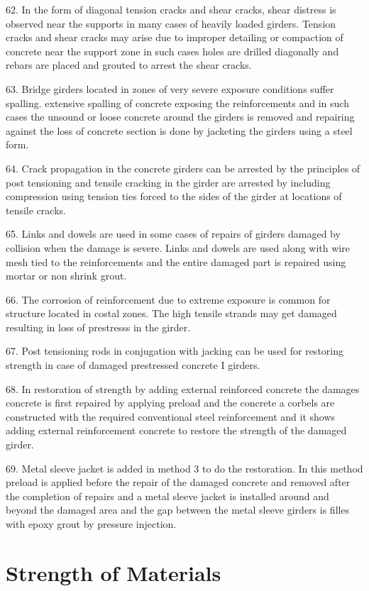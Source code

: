 \documentclass[11pt,a4paper]{article}
\begin{document}
62.
In the form of diagonal tension cracks and shear cracks, shear distress is observed near the supports in many cases of heavily loaded girders. Tension cracks and shear cracks may arise due to improper detailing or compaction of concrete near the support zone in such cases holes are drilled diagonally and rebars are placed and grouted to arrest the shear cracks.

63.
Bridge girders located in zones of very severe exposure conditions suffer spalling. extensive spalling of concrete exposing the reinforcements and in such cases the unsound or loose concrete around the girders is removed and repairing against the loss of concrete section is done by jacketing the girders using a steel form.

64.
Crack propagation in the concrete girders can be arrested by the principles of post tensioning and tensile cracking in the girder are arrested by including compression using tension ties forced to the sides of the girder at locations of tensile cracks.

65.
Links and dowels are used in some cases of repairs of girders damaged by collision when the damage is severe. Links and dowels are used along with wire mesh tied to the reinforcements and the entire damaged part is repaired using mortar or non shrink grout.

66.
The corrosion of reinforcement due to extreme exposure is common for structure located in costal zones. The high tensile strands may get damaged resulting in loss of prestresss in the girder.

67.
Post tensioning rods in conjugation with jacking can be used for restoring strength in case of damaged prestressed concrete I girders.

68.
In restoration of strength by adding external reinforced concrete the damages concrete is first repaired by applying preload and the concrete a corbels are constructed with the required conventional steel reinforcement and it shows adding external reinforcement concrete to restore the strength of the damaged girder.

69.
Metal sleeve jacket is added in method 3 to do the restoration. In this method preload is applied before the repair of the damaged concrete and removed after the completion of repairs and a metal sleeve jacket is installed around and beyond the damaged area and the gap between the metal sleeve girders is filles with epoxy grout by pressure injection.

\clearpage
\section{Strength of Materials}
\end{document}
